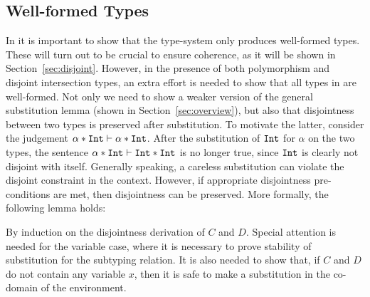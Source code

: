 \subsection{Well-formed Types}
In \name it is important to show that the type-system only produces well-formed types.
These will turn out to be crucial to ensure coherence, as it will be shown in Section~\ref{sec:disjoint}.
However, in the presence of both polymorphism and disjoint intersection types, an extra
effort is needed to show that all types in \name are well-formed.
Not only we need to show a weaker version of the general substitution lemma (shown in
Section~\ref{sec:overview}), but also that disjointness between two types is preserved  
after substitution.
To motivate the latter, consider the judgement $ \alpha * \texttt{Int} \vdash \alpha * \texttt{Int}$.
After the substitution of $\texttt{Int}$ for $\alpha$ on the two types, the sentence
$\alpha * \texttt{Int} \vdash \texttt{Int} * \texttt{Int}$ is no longer true, since $\texttt{Int}$ is
clearly not disjoint with itself.
Generally speaking, a careless substitution can violate the disjoint constraint in the context.
However, if appropriate disjointness pre-conditions are met, then disjointness can
be preserved.
More formally, the following lemma holds: 

{By induction on the disjointness derivation of $C$ and $D$.
  Special attention is needed for the variable case, where it is necessary to prove stability
  of substitution for the subtyping relation.
  It is also needed to show that, if $C$ and $D$ do not contain any variable $x$, then it is
  safe to make a substitution in the co-domain of the environment.}


